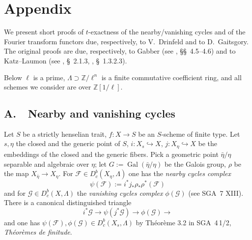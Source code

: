 \documentclass[12pt,oneside]{amsbook}
\theoremstyle{plain}
\theoremstyle{definition}
\newcommand{\FF}{\mathcal{F}}
\newcommand{\GG}{\mathcal{G}}
\newcommand{\ZZ}{\mathbb{Z}}  \newcommand{\QQ}{\mathbb{Q}}
\newcommand{\Dbc}{D^{b}_{c}}
\DeclareMathOperator{\Gal}{Gal}
\newcommand{\hra}{\hookrightarrow}
\begin{document}
\chapter*{Appendix}

We present short proofs of $t$-exactness of the nearby/vanishing cycles and of the Fourier transform functors due, respectively, to V.~Drinfeld and to D.~Gaitsgory. The original proofs are due, respectively, to Gabber (see \cite{Ill94}, \S\S~4.5--4.6) and to Katz--Laumon (see \cite{KL85}, \S~2.1.3, \cite{Lau87}, \S~1.3.2.3).

Below $\ell$ is a prime, $\Lambda\supset\ZZ/\ell^{n}$ is a finite commutative coefficient ring, and all schemes we consider are over $\ZZ[1/\ell]$.

\section*{A.\ \ Nearby and vanishing cycles}

Let $S$ be a strictly henselian trait, $f:X\to S$ be an $S$-scheme of finite type. Let $s,\eta$ the closed and the generic point of $S$, $i:X_{s}\hra X$, $j:X_{\eta}\hra X$ be the embeddings of the closed and the generic fibers. Pick a geometric point $\bar\eta/\eta$ separable and algebraic over $\eta$; let $G:=\Gal(\bar\eta/\eta)$ be the Galois group, $\rho$ be the map $X_{\bar\eta}\to X_{\eta}$. For $\FF\in\Dbc(X_{\eta},\Lambda)$ one has the \emph{nearby cycles complex}
\[
  \psi(\FF):=i^{*}j_{*}\rho_{*}\rho^{*}(\FF)
\]
and for $\GG\in\Dbc(X,\Lambda)$ the \emph{vanishing cycles complex} $\phi(\GG)$ (see SGA~7 XIII). There is a canonical distinguished triangle
\[
  i^{*}\GG\longrightarrow\psi(j^{*}\GG)\longrightarrow\phi(\GG)\longrightarrow
\]
and one has $\psi(\FF),\phi(\GG)\in\Dbc(X_{s},\Lambda)$ by Théorème 3.2 in SGA~4\,1/2, \emph{Théorèmes de finitude}.
\end{document}
